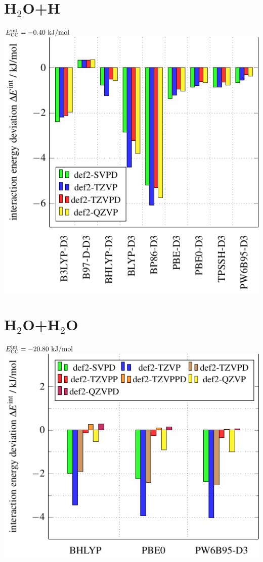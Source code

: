 \documentclass{article}
\newcommand\eint{\enmat{E^{\te{int}}}}
\newcommand\ecc{\enmat{\eint_{\te {CC}}}}
\newcommand\kmo{\enmat{\te {kJ/mol}}}
\begin{document}
\section*{H$_2$O+H }
\large$\ecc=-0.40\ \kmo$ \\

\includegraphics[width=.48\textwidth]{H2O+H+D3.pdf}

\section*{H$_2$O+H$_2$O}
\large$\ecc=-20.80\ \kmo$ \\
{\includegraphics[width=.48\textwidth]{H2O+H2O+BasisCompare.pdf}}
\end{document}
